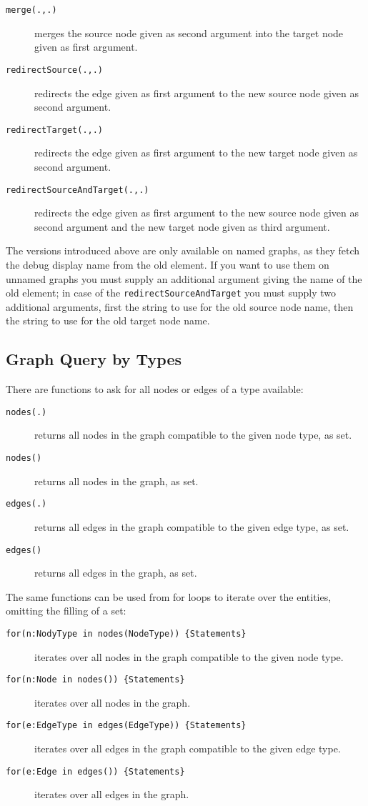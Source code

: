 \begin{description}
\item[\texttt{merge(.,.)}] merges the source node given as second argument into the target node given as first argument.
\item[\texttt{redirectSource(.,.)}] redirects the edge given as first argument to the new source node given as second argument.
\item[\texttt{redirectTarget(.,.)}] redirects the edge given as first argument to the new target node given as second argument.
\item[\texttt{redirectSourceAndTarget(.,.)}] redirects the edge given as first argument to the new source node given as second argument and the new target node given as third argument.
\end{description}

The versions introduced above are only available on named graphs, as they fetch the debug display name from the old element.
If you want to use them on unnamed graphs you must supply an additional argument giving the name of the old element; in case of the \texttt{redirectSourceAndTarget} you must supply two additional arguments, first the string to use for the old source node name, then the string to use for the old target node name.

\subsection{Graph Query by Types}

There are functions to ask for all nodes or edges of a type available: 
\begin{description}
\item[\texttt{nodes(.)}] returns all nodes in the graph compatible to the given node type, as set.
\item[\texttt{nodes()}] returns all nodes in the graph, as set.
\item[\texttt{edges(.)}] returns all edges in the graph compatible to the given edge type, as set.
\item[\texttt{edges()}] returns all edges in the graph, as set.
\end{description}

The same functions can be used from for loops to iterate over the entities, omitting the filling of a set: 
\begin{description}
\item[\texttt{for(n:NodyType in nodes(NodeType)) \{Statements\}} ] iterates over all nodes in the graph compatible to the given node type.
\item[\texttt{for(n:Node in nodes()) \{Statements\}} ] iterates over all nodes in the graph.
\item[\texttt{for(e:EdgeType in edges(EdgeType)) \{Statements\}} ] iterates over all edges in the graph compatible to the given edge type.
\item[\texttt{for(e:Edge in edges()) \{Statements\}} ] iterates over all edges in the graph.
\end{description}

